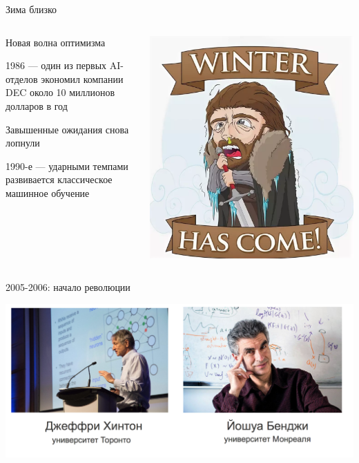 \documentclass[notes,12pt, aspectratio=169]{beamer}
\newenvironment{wideitemize}{\itemize\addtolength{\itemsep}{10pt}}{\enditemize}
\begin{document}
\begin{frame}{Зима близко}
\begin{columns}[T] 
\begin{column}{.5\textwidth}
\begin{wideitemize} 
\item Новая волна оптимизма

\item 1986 — один из первых AI-отделов экономил компании DEC около 10 миллионов долларов в год

\item Завышенные ожидания снова лопнули

\item 1990-е — ударными темпами развивается классическое машинное обучение
\end{wideitemize} 
\end{column}%
\hfill%
\begin{column}{.5\textwidth}
\begin{center}
\includegraphics[width=.79\linewidth]{stark_2.png}
\end{center}
\end{column}%
\end{columns}
\end{frame}


\begin{frame}{2005-2006: начало революции}
\begin{center}
\includegraphics[width=0.9\paperwidth]{revolution.png}
\end{center}
\end{frame}
\end{document}
